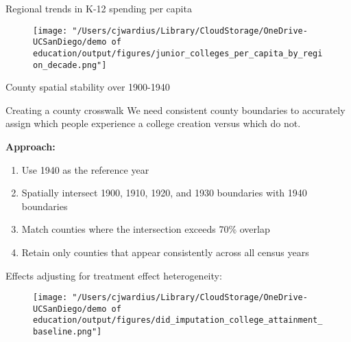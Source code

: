 \documentclass[notes,11pt, aspectratio=169]{beamer}
\begin{document}
\begin{frame}[label=regional_junior_foundings]{Regional trends in K-12 spending per capita}
  \begin{figure}
        \centering
        \texttt{[image: "/Users/cjwardius/Library/CloudStorage/OneDrive-UCSanDiego/demo of education/output/figures/junior\_colleges\_per\_capita\_by\_region\_decade.png"]}
    \end{figure}
    \centering
    \hyperlink{west_focuses_on_public}{}
\end{frame}


\begin{frame}[label=spatialstability]{County spatial stability over 1900-1940}
    

    \vspace{1em}
    \centering
    \hyperlink{isolating}{}
\end{frame}


\begin{frame}[label=countycrosswalk]{Creating a county crosswalk}
We need consistent county boundaries to accurately assign which people experience a college creation versus which do not.
\vspace{.5cm}

\textbf{Approach:}
\begin{enumerate}
\item Use 1940 as the reference year
\item Spatially intersect 1900, 1910, 1920, and 1930 boundaries with 1940 boundaries
\item Match counties where the intersection exceeds 70\% overlap
\item Retain only counties that appear consistently across all census years
\end{enumerate}
\vspace{1em}
\centering
\hyperlink{isolating}{}
\end{frame}


\begin{frame}[label=borusyak]{Effects adjusting for treatment effect heterogeneity: \cite{borusyakRevisitingEventStudyDesigns2024}}
  \begin{figure}
        \centering
        \texttt{[image: "/Users/cjwardius/Library/CloudStorage/OneDrive-UCSanDiego/demo of education/output/figures/did\_imputation\_college\_attainment\_baseline.png"]}
    \end{figure}
    \centering
    \hyperlink{robustness}{}
\end{frame}
\end{document}
